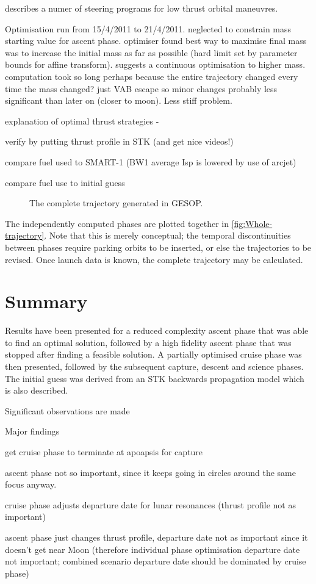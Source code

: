 \textcite{Pollard2000} describes a numer of steering programs for low thrust orbital maneuvres.

Optimisation run from 15/4/2011 to 21/4/2011. neglected to constrain mass starting value for ascent phase. optimiser found best way to maximise final mass was to increase the initial mass as far as possible (hard limit set by parameter bounds for affine transform). suggests a continuous optimisation to higher mass. computation took so long perhaps because the entire trajectory changed every time the mass changed? just VAB escape so minor changes probably less significant than later on (closer to moon). Less stiff problem.

explanation of optimal thrust strategies - \textcite{Herbiniere2000}

verify by putting thrust profile in STK (and get nice videos!)

compare fuel used to SMART-1 (BW1 average Isp is lowered by use of arcjet)

compare fuel use to initial guess


\begin{figure}
\centering
\def\svgwidth{\textwidth}

\caption{The complete trajectory generated in GESOP.} \label{fig:Whole-trajectory}
\end{figure}

The independently computed phases are plotted together in \autoref{fig:Whole-trajectory}. Note that this is merely conceptual; the temporal discontinuities between phases require parking orbits to be inserted, or else the trajectories to be revised. Once launch data is known, the complete trajectory may be calculated.

\section{Summary} \label{sec:Results-summary}

Results have been presented for a reduced complexity ascent phase that was able to find an optimal solution, followed by a high fidelity ascent phase that was stopped after finding a feasible solution. A partially optimised cruise phase was then presented, followed by the subsequent capture, descent and science phases. The initial guess was derived from an STK backwards propagation model which is also described.

Significant observations are made 

Major findings



get cruise phase to terminate at apoapsis for capture

ascent phase not so important, since it keeps going in circles around the same focus anyway.

cruise phase adjusts departure date for lunar resonances (thrust profile not as important)

ascent phase just changes thrust profile, departure date not as important since it doesn't get near Moon (therefore individual phase optimisation departure date not important; combined scenario departure date should be dominated by cruise phase)


